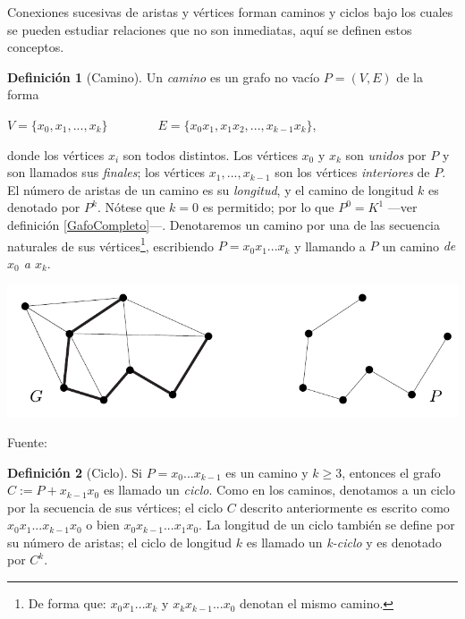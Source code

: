 \documentclass[letterpaper, 11pt]{book}
\theoremstyle{definition}
\newtheorem{definition}{Definición}[chapter]
\theoremstyle{remark}
\begin{document}
Conexiones sucesivas de aristas y vértices forman caminos y ciclos bajo los cuales se pueden estudiar relaciones que no son inmediatas, aquí se definen estos conceptos.

\begin{definition}[Camino]
\label{Camino}
	Un \emph{camino} es un grafo no vacío $P = (V,E)$ de la forma
	
	\begin{center}
	$V = \{x_{0},x_{1},...,x_{k}\} \hspace{4em} E = \{x_{0}x_{1},x_{1}x_{2},...,x_{k-1}x_{k}\}$,
	\end{center}
	
	donde los vértices $x_{i}$ son todos distintos. Los vértices $x_{0}$ y $x_{k}$ son \emph{unidos} por $P$ y son llamados sus \emph{finales}; los vértices $x_{1},...,x_{k-1}$ son los vértices \emph{interiores} de $P$. 
	El número de aristas de un camino es su \emph{longitud}, y el camino de longitud $k$ es denotado por $P^{k}$. Nótese que $k=0$ es permitido; por lo que $P^{0} = K^{1}$ ---ver definición \ref{GafoCompleto}---. 
	Denotaremos un camino por una de las secuencia naturales de sus vértices\footnote{De forma que: $x_{0}x_{1}...x_{k}$ y $x_{k}x_{k-1}...x_{0}$ denotan el mismo camino.}, escribiendo $P=x_{0}x_{1}...x_{k}$ y llamando a $P$ un camino \emph{de $x_{0}$ a $x_{k}$}.
\end{definition}


\begin{minipage}{\linewidth}
\centering
{} \label{1.2_CaminoP6}
\includegraphics[scale=.3]{img/1.2_CaminoP6.png}
\par\bigskip
\small Fuente: \citep[6]{2005_Diestel_GraphThery}
\end{minipage}\bigskip


\begin{definition}[Ciclo]
\label{Ciclo}
	Si $P= x_{0}...x_{k-1}$ es un camino y $k \geq 3$, entonces el grafo $C:=P+x_{k-1}x_{0}$ es llamado un \emph{ciclo}. Como en los caminos, denotamos a un ciclo por la secuencia de sus vértices; el ciclo $C$ descrito anteriormente es escrito como $x_{0}x_{1}...x_{k-1}x_{0}$ o bien $x_{0}x_{k-1}...x_{1}x_{0}$. 
	La longitud de un ciclo también se define por su número de aristas; el ciclo de longitud $k$ es llamado un \emph{k-ciclo} y es denotado por $C^{k}$.
\end{definition}
\end{document}
